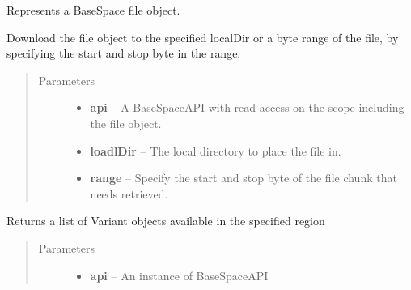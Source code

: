 \documentclass[letterpaper,10pt,english]{sphinxmanual}
\begin{document}
\begin{fulllineitems}
\label{Available modules:BaseSpacePy.model.File.File}
Represents a BaseSpace file object.

\begin{fulllineitems}
\label{Available modules:BaseSpacePy.model.File.File.downloadFile}
Download the file object to the specified localDir or a byte range of the file, by specifying the 
start and stop byte in the range.
\begin{quote}\begin{description}
\item[{Parameters}] \leavevmode\begin{itemize}
\item {} 
\textbf{api} -- A BaseSpaceAPI with read access on the scope including the file object.

\item {} 
\textbf{loadlDir} -- The local directory to place the file in.

\item {} 
\textbf{range} -- Specify the start and stop byte of the file chunk that needs retrieved.

\end{itemize}

\end{description}\end{quote}

\end{fulllineitems}


\begin{fulllineitems}
\label{Available modules:BaseSpacePy.model.File.File.filterVariant}
Returns a list of Variant objects available in the specified region
\begin{quote}\begin{description}
\item[{Parameters}] \leavevmode\begin{itemize}
\item {} 
\textbf{api} -- An instance of BaseSpaceAPI


\end{itemize}
\end{description}
\end{quote}
\end{fulllineitems}
\end{fulllineitems}
\end{document}
